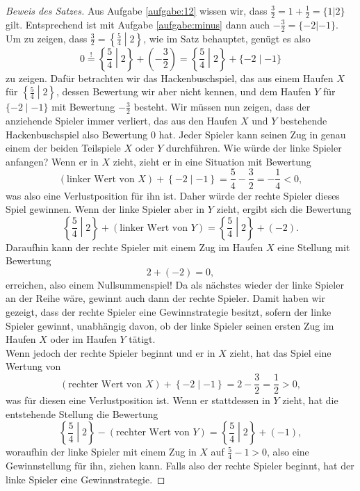 \documentclass{zirkelbrief1516}
\begin{document}
\begin{proof}[Beweis des Satzes]
Aus Aufgabe \ref{aufgabe:12} wissen wir, dass $\frac{3}{2}=1 + \frac 12 =\{1|2\}$ gilt. Entsprechend ist mit Aufgabe \ref{aufgabe:minus} dann auch $-\frac 32 = \{-2|-1\}$. Um zu zeigen, dass $\frac{3}{2}=\left\{\frac{5}{4}\middle|2\right\}$, wie im Satz behauptet, gen\"ugt es also
\begin{equation*}
  0 \stackrel != \left\{\frac{5}{4}\middle|2\right\}+\left(-\frac{3}{2}\right)= \left\{\frac{5}{4}\middle| 2\right\}+\{-2\mid-1\}
\end{equation*}
zu zeigen. Daf\"ur betrachten wir das Hackenbuschspiel, das aus einem Haufen $X$ f\"ur $\left\{\frac{5}{4}\middle| 2\right\}$, dessen Bewertung wir aber nicht kennen, und dem Haufen $Y$ f\"ur $\{-2\mid-1\}$ mit Bewertung $-\frac 32$ besteht. Wir m\"ussen nun zeigen, dass der anziehende Spieler immer verliert, das aus den Haufen $X$ und $Y$ bestehende Hackenbuschspiel also Bewertung 0 hat. Jeder Spieler kann seinen Zug in genau einem der beiden Teilspiele $X$ oder $Y$ durchf\"uhren. Wie würde der linke Spieler anfangen? Wenn er in $X$ zieht, zieht er in eine Situation mit Bewertung
\[ \left( \text{linker Wert von $X$} \right) + \left\{ -2 \mid -1 \right\} = \frac{5}{4}-\frac{3}{2}=-\frac 14<0, \]
was also eine Verlustposition für ihn ist. Daher w\"urde der rechte Spieler dieses Spiel gewinnen. Wenn der linke Spieler aber in $Y$ zieht, ergibt sich die Bewertung
\[ \left\{\frac{5}{4}\middle| 2\right\}+ \left( \text{linker Wert von $Y$} \right) = \left\{\frac{5}{4}\middle| 2\right\}+(-2). \]
Daraufhin kann der rechte Spieler mit einem Zug im Haufen $X$ eine Stellung mit Bewertung
\[ 2+(-2)=0, \]
erreichen, also einem Nullsummenspiel! Da als n\"achstes wieder der linke Spieler an der Reihe w\"are, gewinnt auch dann der rechte Spieler. Damit haben wir gezeigt, dass der rechte Spieler eine Gewinnstrategie besitzt, sofern der linke Spieler gewinnt, unabh\"angig davon, ob der linke Spieler seinen ersten Zug im Haufen $X$ oder im Haufen $Y$ t\"atigt.
\smallskip \\
Wenn jedoch der rechte Spieler beginnt und er in $X$ zieht, hat das Spiel eine Wertung von 
\[ \left( \text{rechter Wert von $X$} \right) + \left\{ -2 \mid -1 \right\} = 2-\frac{3}{2}=\frac 12>0, \]
was f\"ur diesen eine Verlustposition ist. Wenn er stattdessen in $Y$ zieht, hat die entstehende Stellung die Bewertung
\[ \left\{\frac{5}{4}\middle|2\right\} - \left( \text{rechter Wert von $Y$} \right) = \left\{\frac{5}{4}\middle|2\right\}+(-1), \]
woraufhin der linke Spieler mit einem Zug in $X$ auf $\frac{5}{4}-1>0$, also eine Gewinnstellung für ihn, ziehen kann. Falls also der rechte Spieler beginnt, hat der linke Spieler eine Gewinnstrategie.

\end{proof}
\end{document}
